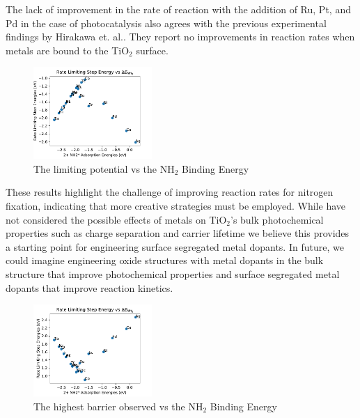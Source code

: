 The lack of improvement in the rate of reaction with the addition of Ru, Pt, and Pd in the case of photocatalysis also agrees with the previous experimental findings by Hirakawa et. al.\cite{Hirakawa_2017}. They report no improvements in reaction rates when metals are bound to the TiO$_2$ surface.


\begin{figure}
    \centering
    \includegraphics[width=0.4\textwidth]{Images/NH2_v_limiting_pot.pdf}
    
    \caption{The limiting potential vs the NH$_2$ Binding Energy}
    \label{fig:NH2_limiting_pot}
\end{figure}

These results highlight the challenge of improving reaction rates for nitrogen fixation, indicating that more creative strategies must be employed. While have not considered the possible effects of metals on TiO$_2$'s bulk photochemical properties such as charge separation and carrier lifetime we believe this provides a starting point for engineering surface segregated metal dopants. In future, we could imagine engineering oxide structures with metal dopants in the bulk structure that improve photochemical properties and surface segregated metal dopants that improve reaction kinetics.

\begin{figure}
    \centering
    \includegraphics[width=0.4\textwidth]{Images/NH2_v_rate_limiting.pdf}
    
    \caption{The highest barrier observed vs the NH$_2$ Binding Energy}
    \label{fig:NH2_limiting_bar}
\end{figure}

